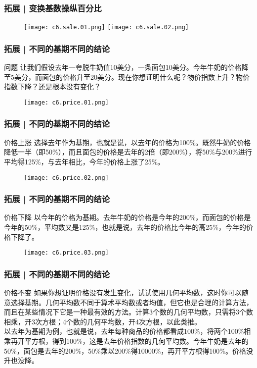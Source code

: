 \begin{frame}
  \frametitle{拓展 | 变换基数操纵百分比}
  \begin{figure}
    \centering
    \texttt{[image: c6.sale.01.png]}\quad
    \texttt{[image: c6.sale.02.png]}
  \end{figure}
\end{frame}

\begin{frame}
  \frametitle{拓展 | 不同的基期不同的结论}
  \begin{block}{问题}
让我们假设去年一夸脱牛奶值10美分，一条面包10美分。今年牛奶的价格降至5美分，而面包的价格升至20美分。现在你想证明什么呢？物价指数上升？物价指数下降？还是根本没有变化？
  \end{block}
  \begin{figure}
    \centering
    \texttt{[image: c6.price.01.png]}
  \end{figure}
\end{frame}

\begin{frame}
  \frametitle{拓展 | 不同的基期不同的结论}
  \begin{block}{价格上涨}
 选择去年作为基期，也就是说，以去年的价格为100\%。既然牛奶的价格降低一半（即50\%），而且面包的价格是去年的2倍（即200\%），将50\%与200\%进行平均得125\%，与去年相比，今年的价格上涨了25\%。
  \end{block}
  \begin{figure}
    \centering
    \texttt{[image: c6.price.02.png]}
  \end{figure}
\end{frame}

\begin{frame}
  \frametitle{拓展 | 不同的基期不同的结论}
  \begin{block}{价格下降}
 以今年的价格为基期。去年牛奶的价格是今年的200\%，而面包的价格是今年的50\%，平均数又是125\%，也就是说，去年的价格比今年的高25\%，今年的价格下降了。
  \end{block}
  \begin{figure}
    \centering
    \texttt{[image: c6.price.03.png]}
  \end{figure}
\end{frame}

\begin{frame}
  \frametitle{拓展 | 不同的基期不同的结论}
  \begin{block}{价格不变}
    如果你想证明价格没有发生变化，试试使用几何平均数，这时你可以随意选择基期。几何平均数不同于算术平均数或者均值，但它也是合理的计算方法，而且在某些情况下它是一种最有效的方法。计算3个数的几何平均数，只需将3个数相乘，开3次方根；4个数的几何平均数，开4次方根，以此类推。\\
    \vspace{0.5em}
  以去年为基期为例，也就是说，去年每种商品的价格都看成100\%，将两个100\%相乘再开平方根，得到100\%，这是去年价格指数的几何平均数。今年牛奶是去年的50\%，面包是去年的200\%，50\%乘以200\%得10000\%，再开平方根得100\%。价格没升也没降。
  \end{block}
\end{frame}

